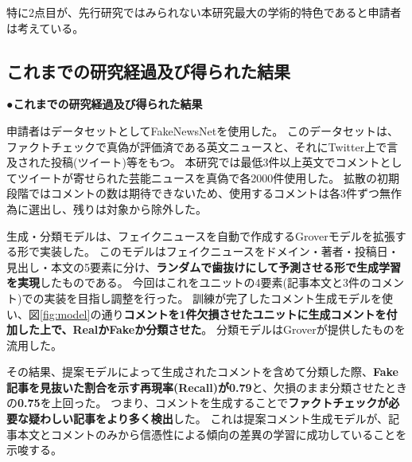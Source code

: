 {	特に2点目が、先行研究ではみられない本研究最大の学術的特色であると申請者は考えている。

	\subsection{これまでの研究経過及び得られた結果}
	\noindent
	●\textbf{これまでの研究経過及び得られた結果}

	申請者はデータセットとしてFakeNewsNet\cite{Shu2018FakeNewsNetAD, shu2017fake}を使用した。
	このデータセットは、ファクトチェックで真偽が評価済である英文ニュースと、それにTwitter上で言及された投稿(ツイート)等をもつ。
	本研究では最低3件以上英文でコメントとしてツイートが寄せられた芸能ニュースを真偽で各2000件使用した。
	拡散の初期段階ではコメントの数は期待できないため、使用するコメントは各3件ずつ無作為に選出し、残りは対象から除外した。

	生成・分類モデルは、フェイクニュースを自動で作成するGroverモデル\cite{NIPS2019_9106}を拡張する形で実装した。
	このモデルはフェイクニュースをドメイン・著者・投稿日・見出し・本文の5要素に分け、\textbf{ランダムで歯抜けにして予測させる形で生成学習を実現}したものである。
	今回はこれをユニットの4要素(記事本文と3件のコメント)での実装を目指し調整を行った。
	訓練が完了したコメント生成モデルを使い、図\ref{fig:model}の通り\textbf{コメントを1件欠損させたユニットに生成コメントを付加した上で、RealかFakeか分類させた}。
	分類モデルはGroverが提供したものを流用した。

	その結果、提案モデルによって生成されたコメントを含めて分類した際、\textbf{Fake記事を見抜いた割合を示す再現率(Recall)が0.79}と、欠損のまま分類させたときの\textbf{0.75}を上回った。
	つまり、コメントを生成することで\textbf{ファクトチェックが必要な疑わしい記事をより多く検出}した\cite{EasyChair:3190}。
	これは提案コメント生成モデルが、記事本文とコメントのみから信憑性による傾向の差異の学習に成功していることを示唆する。

}
